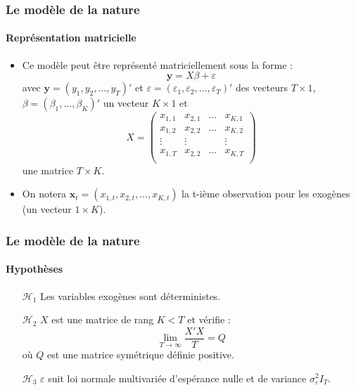 \documentclass[10pt]{beamer}
\theoremstyle{plain}
\begin{document}
\begin{frame}
  \frametitle{Le modèle de la nature}
  \framesubtitle{Représentation matricielle}

  \begin{itemize}

  \item Ce modèle peut être représenté matriciellement sous la forme :
    \[
      \mathbf y = X\beta + \varepsilon
    \]
    avec $\mathbf y = \left( y_1, y_2, \dots, y_T\right)'$ et $\varepsilon = \left( \varepsilon_1, \varepsilon_2, \dots, \varepsilon_T\right)'$ des vecteurs $T\times 1$, $\beta = \left( \beta_1, \dots, \beta_K \right)'$  un vecteur $K\times 1$ et
    \[
      X =
      \begin{pmatrix}
        x_{1,1} & x_{2,1} & \dots & x_{K,1} \\
        x_{1,2} & x_{2,2} & \dots & x_{K,2} \\
        \vdots  & \vdots  &       & \vdots  \\
        x_{1,T} & x_{2,2} & \dots & x_{K,T} \\
      \end{pmatrix}
    \]
    une matrice $T\times K$.\newline

    \item On notera $\mathbf x_t = (x_{1,t},x_{2,t}, \dots, x_{K,t})$ la t-ième observation pour les exogènes (un vecteur $1\times K$).

  \end{itemize}

\end{frame}


\begin{frame}
  \frametitle{Le modèle de la nature}
  \framesubtitle{Hypothèses}

  \begin{itemize}

  \item[$\mathcal H_1$] Les variables exogènes sont déterministes.\newline

    \bigskip\bigskip

  \item[$\mathcal H_2$] $X$ est une matrice de rang $K<T$ et vérifie :
    \[
      \lim_{T\rightarrow\infty} \frac{X'X}{T} = Q
    \]
    où $Q$ est une matrice symétrique définie positive.\newline

    \bigskip\bigskip

  \item[$\mathcal H_3$] $\varepsilon$ suit loi normale multivariée d'espérance nulle et de variance $\sigma_{\varepsilon}^2I_T$.
  \end{itemize}

\end{frame}
\end{document}
